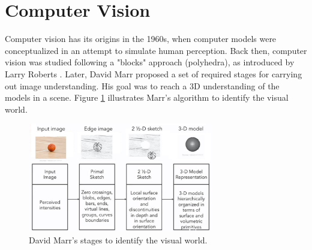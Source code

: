 \section{Computer Vision}\label{appendix:compvis}

Computer vision has its origins in the 1960s, when computer models were conceptualized in an attempt to simulate human perception. Back then, computer vision was studied following a "blocks" approach (polyhedra), as introduced by Larry Roberts \cite{huang1996computer}. Later, David Marr proposed a set of required stages for carrying out image understanding. His goal was to reach a 3D understanding of the models in a scene. Figure \ref{fig:marr-stages} illustrates Marr's algorithm to identify the visual world. 

\begin{figure}[!ht]
        \centering
        \includegraphics[width=0.72\textwidth]{images/marr-stages}
        \caption{David Marr's stages to identify the visual world.}
        \label{fig:marr-stages}
    \end{figure}
    

